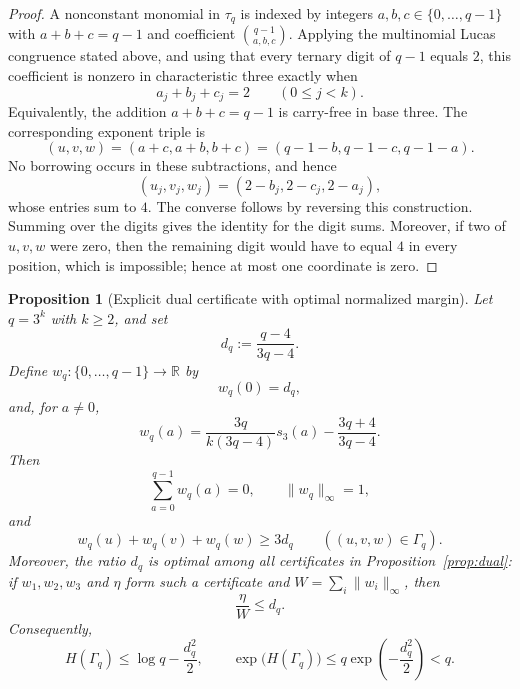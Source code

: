 \documentclass[10pt,a4paper]{amsart}
\newtheorem{proposition}[theorem]{Proposition}
\theoremstyle{definition}
\newcommand{\1}{\mathbf 1}
\begin{document}
\begin{proof}
A nonconstant monomial in $\tau_q$ is indexed by integers $a,b,c\in\{0,\ldots,q-1\}$ with
$a+b+c=q-1$ and coefficient
$\binom{q-1}{a,b,c}$.  Applying the multinomial Lucas congruence stated above, and using that every ternary digit of $q-1$ equals $2$, this coefficient is nonzero in characteristic three exactly when
\[
 a_j+b_j+c_j=2
 \qquad(0\le j<k).
\]
Equivalently, the addition $a+b+c=q-1$ is carry-free in base three.  The corresponding exponent triple is
\[
 (u,v,w)=(a+c,a+b,b+c)=(q-1-b,q-1-c,q-1-a).
\]
No borrowing occurs in these subtractions, and hence
\[
 (u_j,v_j,w_j)=(2-b_j,2-c_j,2-a_j),
\]
whose entries sum to $4$.  The converse follows by reversing this construction.  Summing over the digits gives the identity for the digit sums.  Moreover, if two of $u,v,w$ were zero, then the remaining digit would have to equal $4$ in every position, which is impossible; hence at most one coordinate is zero.
\end{proof}

\begin{proposition}[Explicit dual certificate with optimal normalized margin]\label{prop:q3-explicit-dual}
Let $q=3^k$ with $k\ge2$, and set
\[
 d_q:=\frac{q-4}{3q-4}.
\]
Define $w_q:\{0,\ldots,q-1\}\to\mathbb R$ by
\[
 w_q(0)=d_q,
\]
and, for $a\ne0$,
\[
 w_q(a)
 =\frac{3q}{k(3q-4)}s_3(a)
  -\frac{3q+4}{3q-4}.
\]
Then
\[
 \sum_{a=0}^{q-1}w_q(a)=0,
 \qquad
 \lVert w_q\rVert_\infty=1,
\]
and
\[
 w_q(u)+w_q(v)+w_q(w)\ge 3d_q
 \qquad((u,v,w)\in\Gamma_q).
\]
Moreover, the ratio $d_q$ is optimal among all certificates in Proposition~\ref{prop:dual}: if $w_1,w_2,w_3$ and $\eta$ form such a certificate and
$W=\sum_i\lVert w_i\rVert_\infty$, then
\[
 \frac{\eta}{W}\le d_q.
\]
Consequently,
\[
 H(\Gamma_q)
 \le \log q-\frac{d_q^2}{2},
\qquad
 \exp\bigl(H(\Gamma_q)\bigr)
 \le q\exp\!\left(-\frac{d_q^2}{2}\right)<q.
\]
\end{proposition}
\end{document}

